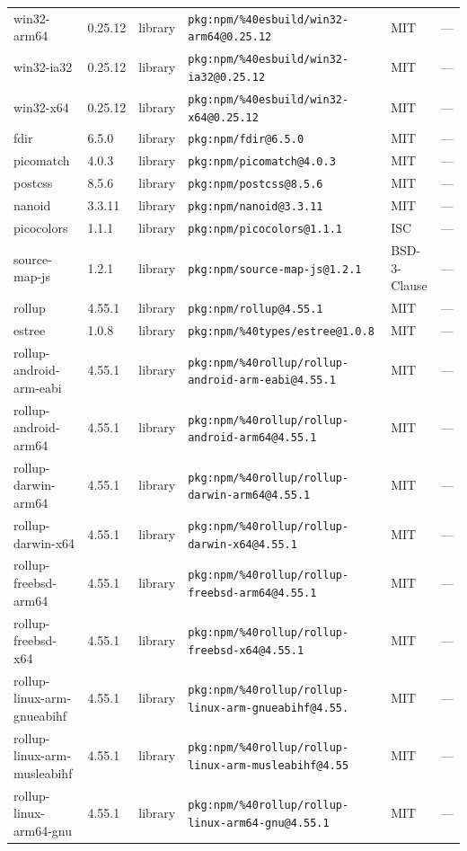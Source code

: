 \documentclass[11pt]{article}
\begin{document}
\begin{longtable}{|l|l|l|p{2.2cm}|l|p{4cm}|}
win32-arm64 & 0.25.12 & library & \texttt{pkg:npm/\%40esbuild/win32-arm64@0.25.12} & MIT & — \\
win32-ia32 & 0.25.12 & library & \texttt{pkg:npm/\%40esbuild/win32-ia32@0.25.12} & MIT & — \\
win32-x64 & 0.25.12 & library & \texttt{pkg:npm/\%40esbuild/win32-x64@0.25.12} & MIT & — \\
fdir & 6.5.0 & library & \texttt{pkg:npm/fdir@6.5.0} & MIT & — \\
picomatch & 4.0.3 & library & \texttt{pkg:npm/picomatch@4.0.3} & MIT & — \\
postcss & 8.5.6 & library & \texttt{pkg:npm/postcss@8.5.6} & MIT & — \\
nanoid & 3.3.11 & library & \texttt{pkg:npm/nanoid@3.3.11} & MIT & — \\
picocolors & 1.1.1 & library & \texttt{pkg:npm/picocolors@1.1.1} & ISC & — \\
source-map-js & 1.2.1 & library & \texttt{pkg:npm/source-map-js@1.2.1} & BSD-3-Clause & — \\
rollup & 4.55.1 & library & \texttt{pkg:npm/rollup@4.55.1} & MIT & — \\
estree & 1.0.8 & library & \texttt{pkg:npm/\%40types/estree@1.0.8} & MIT & — \\
rollup-android-arm-eabi & 4.55.1 & library & \texttt{pkg:npm/\%40rollup/rollup-android-arm-eabi@4.55.1} & MIT & — \\
rollup-android-arm64 & 4.55.1 & library & \texttt{pkg:npm/\%40rollup/rollup-android-arm64@4.55.1} & MIT & — \\
rollup-darwin-arm64 & 4.55.1 & library & \texttt{pkg:npm/\%40rollup/rollup-darwin-arm64@4.55.1} & MIT & — \\
rollup-darwin-x64 & 4.55.1 & library & \texttt{pkg:npm/\%40rollup/rollup-darwin-x64@4.55.1} & MIT & — \\
rollup-freebsd-arm64 & 4.55.1 & library & \texttt{pkg:npm/\%40rollup/rollup-freebsd-arm64@4.55.1} & MIT & — \\
rollup-freebsd-x64 & 4.55.1 & library & \texttt{pkg:npm/\%40rollup/rollup-freebsd-x64@4.55.1} & MIT & — \\
rollup-linux-arm-gnueabihf & 4.55.1 & library & \texttt{pkg:npm/\%40rollup/rollup-linux-arm-gnueabihf@4.55.} & MIT & — \\
rollup-linux-arm-musleabihf & 4.55.1 & library & \texttt{pkg:npm/\%40rollup/rollup-linux-arm-musleabihf@4.55} & MIT & — \\
rollup-linux-arm64-gnu & 4.55.1 & library & \texttt{pkg:npm/\%40rollup/rollup-linux-arm64-gnu@4.55.1} & MIT & — \\

\end{longtable}
\end{document}
